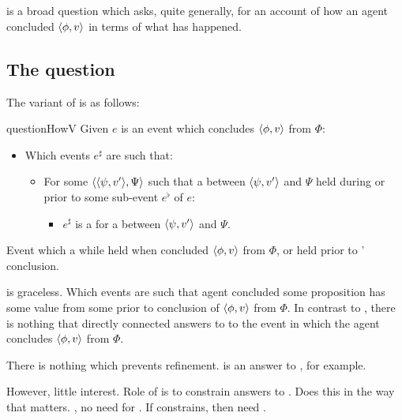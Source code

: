 \section{\qHowV{}}
\label{cha:var:qhowv}

\begin{note}
  \qHow{} is a broad question which asks, quite generally, for an account of how an agent concluded \(\langle \phi, v \rangle\) in terms of what has happened.
\end{note}

\subsection{The question}
\label{cha:var:qhowv:question}

\begin{note}
  The variant of \qHow{} is as follows:

  \begin{question}{questionHowV}{\qHowV{}}%
    \label{q:how:v}%
    Given \(e\) is an event which \vAgent{} concludes \(\langle \phi, v \rangle\) from \(\Phi\):
    \begin{itemize}
    \item
      Which events \(e^{\sharp}\) are such that:
      \begin{itemize}
      \item
        For some \(\langle \langle \psi, v' \rangle, \Psi \rangle\) such that a \ros{} between \(\langle \psi, v' \rangle\) and \(\Psi\) held during or prior to some sub-event \(e^{\flat}\) of \(e\):
        \begin{itemize}
        \item
          \(e^{\sharp}\) is a  for a \ros{} between \(\langle \psi, v' \rangle\) and \(\Psi\).
        \end{itemize}
      \end{itemize}
    \end{itemize}
    \vspace{-\baselineskip}
  \end{question}

  Event which \wit{} a \ros{} while held when \vAgent{} concluded \(\langle \phi, v \rangle\) from \(\Phi\), or held prior to \vAgent{}' conclusion.
\end{note}

\begin{note}
  \qHowV{} is graceless.
  Which events are such that agent concluded some proposition has some value from some \pool{} prior to conclusion of \(\langle \phi, v \rangle\) from \(\Phi\).
  In contrast to \qHow{}, there is nothing that directly connected answers to \qHowV{} to the event in which the agent concludes \(\langle \phi, v \rangle\) from \(\Phi\).

  There is nothing which prevents refinement.
  \ros{} is an answer to \qWhyV{}, for example.

  However, little interest.
  Role of \qHowV{} is to constrain answers to \qWhyV{}.
  Does this in the way that matters.
  \supportII{}, no need for \wit{}.
  If constrains, then need \wit{}.
\end{note}

